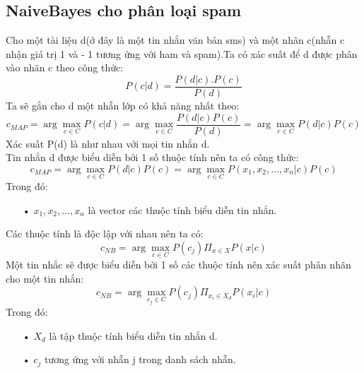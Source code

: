 \documentclass[a4paper,11pt]{report}
\begin{document}
\subsection{NaiveBayes cho phân loại spam}
Cho một tài liệu d(ở đây là một tin nhắn văn bản sms) và một nhãn c(nhẵn c nhận giá trị 1 và - 1 tương ứng với ham và spam).Ta có xác suất để d được phân vào nhãn c theo công thức:
\begin{displaymath}
P(c|d) = \frac{P(d|c).P(c)}{P(d)}
\end{displaymath}
Ta sẽ gắn cho d một nhẵn lớp có khả năng nhất theo:
\begin{displaymath}
\displaystyle c_{MAP} = \arg\max_{c\in C} P(c|d) = \arg\max_{c\in C} \frac{P(d|c)P(c)}{P(d)} = \arg\max_{c\in C} P(d|c)P(c)
\end{displaymath}
Xác suất P(d) là như nhau với mọi tin nhắn d. \\
Tin nhắn d được biểu diễn bởi 1 số thuộc tính nên ta có công thức:
\begin{displaymath}
\displaystyle c_{MAP} = \arg\max_{c\in C} P(d|c)P(c) = \arg\max_{c\in C} P(x_1,x_2,\ldots,x_n|c)P(c)
\end{displaymath}
Trong đó:
\begin{itemize}
\item[•] $x_1, x_2,\ldots, x_n$ là vector các thuộc tính biểu diễn tin nhắn.
\end{itemize}
Các thuộc tính là độc lập với nhau nên ta có:
\begin{displaymath}
\displaystyle c_{NB} = \arg\max_{c\in C}P(c_j)\Pi_{x\in X}P(x|c)
\end{displaymath}
Một tin nhắc sẽ được biểu diễn bởi 1 số các thuộc tính nên xác suất phân nhãn cho một tin nhắn:
\begin{displaymath}
\displaystyle c_{NB} = \arg\max_{c_j\in C}P(c_j)\Pi_{x_i \in X_d}P(x_i|c)
\end{displaymath}
Trong đó:
\begin{itemize}
\item[•] $X_d$ là tập thuộc tính biểu diễn tin nhắn d.
\item[•] $c_j$ tương ứng với nhẵn j trong danh sách nhẵn.
\end{itemize}
\end{document}
